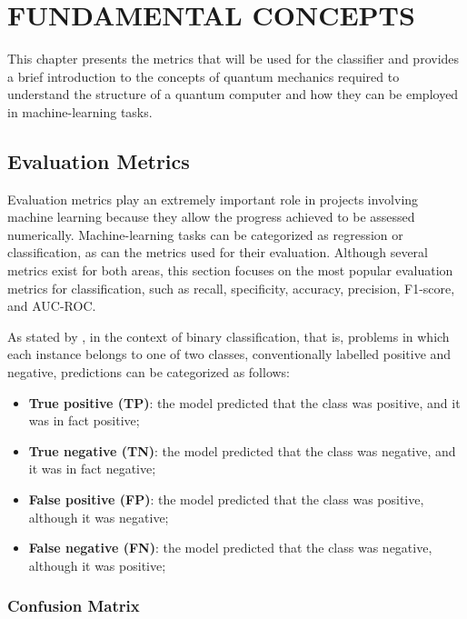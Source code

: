 \chapter{FUNDAMENTAL CONCEPTS}\label{chap:conceitos}

This chapter presents the metrics that will be used for the classifier and provides a brief introduction to the concepts of quantum mechanics required to understand the structure of a quantum computer and how they can be employed in machine-learning tasks.

\section{Evaluation Metrics}

Evaluation metrics play an extremely important role in projects involving machine learning because they allow the progress achieved to be assessed numerically. Machine-learning tasks can be categorized as regression or classification, as can the metrics used for their evaluation. Although several metrics exist for both areas, this section focuses on the most popular evaluation metrics for classification, such as recall, specificity, accuracy, precision, F1-score, and AUC-ROC.

As stated by , in the context of binary classification, that is, problems in which each instance belongs to one of two classes, conventionally labelled positive and negative, predictions can be categorized as follows:

\begin{itemize}
\item \textbf{True positive (TP)}: the model predicted that the class was positive, and it was in fact positive;
\item \textbf{True negative (TN)}: the model predicted that the class was negative, and it was in fact negative;
\item \textbf{False positive (FP)}: the model predicted that the class was positive, although it was negative;
\item \textbf{False negative (FN)}: the model predicted that the class was negative, although it was positive;
\end{itemize}

\subsection{Confusion Matrix}

